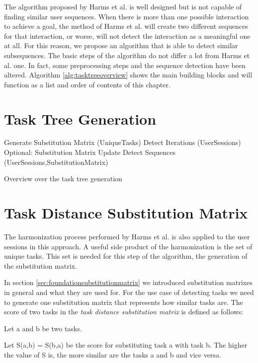 The algorithm proposed by Harms et al. is well designed but is not capable of finding similar user sequences.
When there is more than one possible interaction to achieve a goal, the method of Harms et al. will create two different sequences for that interaction,
or worse, will not detect the interaction as a meaningful one at all. For this reason, we propose an algorithm that is able to detect similar subsequences.
The basic steps of the algorithm do not differ a lot from Harms et al. one. In fact, some preprocessing steps and the sequence detection have been altered.
Algorithm \ref{alg:tasktreeoverview} shows the main building blocks and will function as a list and order of contents of this chapter.
\section{Task Tree Generation}

\begin{algorithm}[h]
\begin{algorithmic}
	\State Generate Substitution Matrix (UniqueTasks)
	\State Detect Iterations (UserSessions)
	\State Optional: Substitution Matrix Update
	\State Detect Sequences (UserSessions,SubstitutionMatrix)
	\EndWhile
	\EndProcedure
\end{algorithmic}
\caption{Overview over the task tree generation}
\label{alg:tasktreeoverview}
\end{algorithm}

\section{Task Distance Substitution Matrix}
The harmonization process performed by Harms et al. is also applied to the user sessions in this approach.
A useful side product of the harmonization is the set of unique tasks.
This set is needed for this step of the algorithm, the generation of the substitution matrix.

In section \ref{sec:foundationsubstitutionmatrix} we introduced substitution matrixes in general and what they are used for.
For the use case of detecting tasks we need to generate one substitution matrix that represents how similar tasks are.
The score of two tasks in the \textit{task distance substitution matrix} is defined as follows:
\begin{definition}
	\item Let a and b be two tasks.
	\item Let S(a,b) = S(b,a) be the score for substituting task a with task b. The higher the value of S is, the more similar are the tasks a and b and vice versa.
\end{definition}

